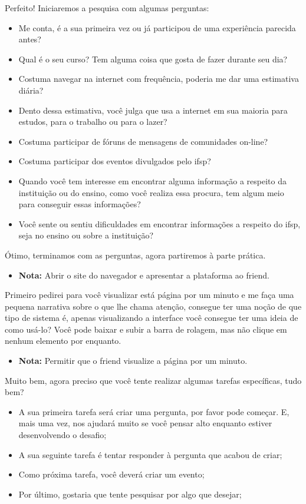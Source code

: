 Perfeito! Iniciaremos a pesquisa com algumas perguntas: 
\begin{itemize}
    \item Me conta, é a sua primeira vez ou já participou de uma experiência parecida antes?
    \item Qual é o seu curso? Tem alguma coisa que gosta de fazer durante seu dia?
    \item Costuma navegar na internet com frequência, poderia me dar uma estimativa diária?
    \item Dento dessa estimativa, você julga que usa a internet em sua maioria para estudos, para o trabalho ou para o lazer? 
    \item Costuma participar de fóruns de mensagens de comunidades on-line?
    \item Costuma participar dos eventos divulgados pelo \acs{ifsp}?
    \item Quando você tem interesse em encontrar alguma informação a respeito da instituição ou do ensino, como você realiza essa procura, tem algum meio para conseguir essas informações? 
    \item Você sente ou sentiu dificuldades em encontrar informações a respeito do \acs{ifsp}, seja no ensino ou sobre a instituição?
\end{itemize}

Ótimo, terminamos com as perguntas, agora partiremos à parte prática. 
\begin{itemize}
    \item \textbf{Nota: } Abrir o site do navegador e apresentar a plataforma ao \gls{friend}. 
\end{itemize}

Primeiro pedirei para você visualizar está página por um minuto e me faça uma pequena narrativa sobre o que lhe chama atenção, consegue ter uma noção de que tipo de sistema é, apenas visualizando a interface você consegue ter uma ideia de como usá-lo? Você pode baixar e subir a barra de rolagem, mas não clique em nenhum elemento por enquanto. 
\begin{itemize}
    \item \textbf{Nota: } Permitir que o \gls{friend} visualize a página por um minuto.  
\end{itemize}

Muito bem, agora preciso que você tente realizar algumas tarefas específicas, tudo bem?
\begin{itemize}
    \item A sua primeira tarefa será criar uma pergunta, por favor pode começar. E, mais uma vez, nos ajudará muito se você pensar alto enquanto estiver desenvolvendo o desafio;
    \item A sua seguinte tarefa é tentar responder à pergunta que acabou de criar;
    \item Como próxima tarefa, você deverá criar um evento;
    \item Por último, gostaria que tente pesquisar por algo que desejar; 
\end{itemize}

